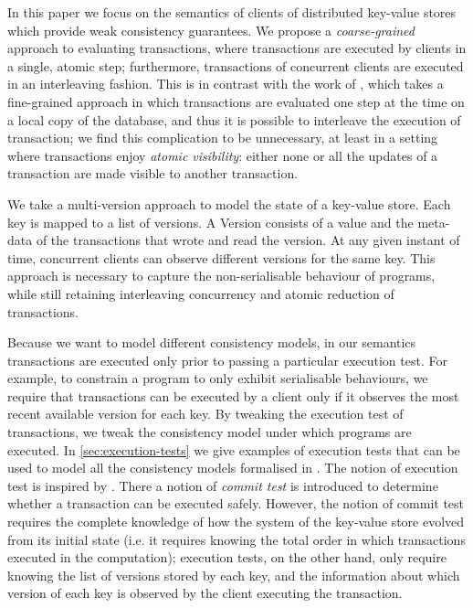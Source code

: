 In this paper we focus on the semantics of clients of distributed key-value 
stores which provide weak consistency guarantees. 
We propose a \emph{coarse-grained} approach to evaluating transactions, 
where transactions are executed by clients in a single, atomic step; furthermore, 
transactions of concurrent clients are executed in an interleaving fashion.
This is in contrast with the work of \cite{alonetogether}, which 
takes a fine-grained approach in which transactions are evaluated one step 
at the time on a local copy of the database, and thus it is possible 
to interleave the execution of transaction; we find this complication to be 
unnecessary, at least in a setting where transactions enjoy \emph{atomic 
visibility}: either none or all the updates of a transaction are made 
visible to another transaction. 

We take a multi-version approach to model the state of a key-value store. 
Each key is mapped to a list of versions. A Version consists of a 
value and the meta-data of the transactions that wrote and read the version. 
At any given instant of time, concurrent clients can observe different versions for the same key.
This approach is necessary to capture the non-serialisable behaviour of 
programs, while still retaining interleaving concurrency and atomic reduction 
of transactions. 

Because we want to model different consistency models, in our semantics 
transactions are executed only prior to passing a particular execution test. For example, 
to constrain a program to only exhibit serialisable behaviours, we require that 
transactions can be executed by a client only if it observes the most 
recent available version for each key. By tweaking the execution test 
of transactions, we tweak the consistency model under which programs 
are executed. In \cref{sec:execution-tests} we give examples of execution tests 
that can be used to model all the consistency models formalised in \cite{framework-concur}.
The notion of execution test is inspired by \cite{seebelieve}. There a notion of \emph{commit test} is introduced 
to determine whether a transaction can be executed safely. However, 
the notion of commit test requires the complete knowledge of 
how the system of the key-value store evolved from its 
initial state (i.e. it requires knowing the total order in which transactions executed in 
the computation); execution tests, on the other hand, only require
knowing the list of versions stored by each key, and the 
information about which version of each key is observed 
by the client executing the transaction.

